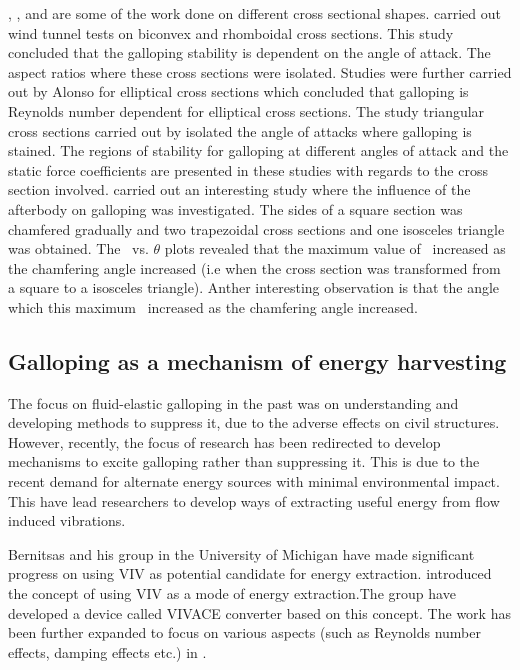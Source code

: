   
\citet{Naudascher1993}, \citet{Ruscheweyh1996}, \citet{Deniz1997} and \citet{Weaver2005} are some of the work done on different cross sectional shapes. \citet{Alonso2009} carried out wind tunnel tests on biconvex and rhomboidal cross sections. This study concluded that the galloping stability is dependent on the angle of attack. The aspect ratios where these cross sections were isolated. Studies were further carried out by Alonso for elliptical cross sections \citep{Alonso2010} which concluded that galloping is Reynolds number dependent for elliptical cross sections. The study triangular cross sections carried out by \citep{Alonso2005} isolated the angle of attacks where galloping is stained. The regions of stability for galloping at different angles of attack and the static force coefficients are presented in these studies with regards to the cross section involved. \citep{Luo1994} carried out an interesting study where the influence of the afterbody on galloping was investigated. The sides of a square section was chamfered gradually and two trapezoidal cross sections and one isosceles triangle was obtained. The \cy\ vs. $\theta$ plots revealed that the maximum value of \cy\ increased as the chamfering angle increased (i.e when the cross section was transformed from a square to a isosceles triangle). Anther interesting observation is that the angle which this maximum \cy\ increased as the chamfering angle increased.       


\subsection{Galloping as a mechanism of energy harvesting}

The focus on fluid-elastic galloping in the past was on understanding and developing methods to suppress it, due to the adverse effects on civil structures. However, recently, the focus of research has been redirected to develop mechanisms to excite galloping rather than suppressing it. This is due to the recent demand for alternate energy sources with minimal environmental impact. This have lead researchers to develop ways of extracting useful energy from flow induced vibrations.

Bernitsas and his group in the University of Michigan have made significant progress on using VIV as potential candidate for energy extraction. \cite{Bernitsas2008a-concept} introduced the concept of using VIV as a mode of energy extraction.The group have developed a device called VIVACE converter based on this concept. The work has been further expanded to focus on various aspects (such as Reynolds number effects, damping effects etc.) in \citet{Bernitsas2009,Raghavan2009,Raghavan2010a,Lee2011a}.












